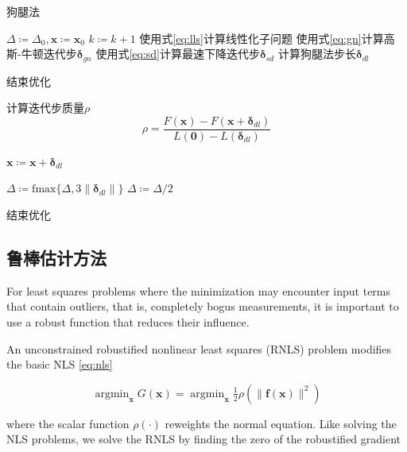 \begin{algorithm}
\caption{狗腿法}
\begin{algorithmic}[1]
    \STATE $\Delta \coloneqq \Delta_0, \bm{x} \coloneqq \bm{x}_0$
        \STATE $k \coloneqq k+1$
        \STATE 使用式\eqref{eq:lls}计算线性化子问题
        \STATE 使用式\eqref{eq:gn}计算高斯-牛顿迭代步$\bm{\delta}_{gn}$
        \STATE 使用式\eqref{eq:sd}计算最速下降迭代步$\bm{\delta}_{sd}$
        \STATE 计算狗腿法步长$\bm{\delta}_{dl}$

            \STATE 结束优化
        \ENDIF

        \STATE 计算迭代步质量$\rho$
        \[
            \rho = \frac {F(\bm{x})-F(\bm{x}+\bm{\delta}_{dl})}
                         {L(\bm{0})-L(\bm{\delta}_{dl})}
        \]

            \STATE $\bm{x} \coloneqq \bm{x} + \bm{\delta}_{dl}$
        \ENDIF

            \STATE $\Delta \coloneqq \text{fmax}\{\Delta,3\lVert\bm{\delta}_{dl}\rVert\}$
            \STATE $\Delta \coloneqq \Delta/2$
        \ENDIF

            \STATE 结束优化
        \ENDIF
    \ENDFOR
\end{algorithmic}
\label{alg:dogleg}
\end{algorithm}

\subsection{鲁棒估计方法}

For least squares problems where the minimization may encounter input terms that contain outliers, that is, completely bogus measurements, it is important to use a robust function that reduces their influence\citep{ceres-solver}.

An unconstrained robustified nonlinear least squares (RNLS) problem modifies the basic NLS \eqref{eq:nls}

\begin{equation}
     \mathop{\arg\min}_{\bm{x}} G(\bm{x}) =
     \mathop{\arg\min}_{\bm{x}} \tfrac{1}{2} \rho
        \left( \lVert \bm{f}(\bm{x}) \rVert^2 \right)
\label{eq:rnls}
\end{equation}

where the scalar function $\rho(\cdot)$ reweights the normal equation. Like solving the NLS problems, we solve the RNLS by finding the zero of the robustified gradient

